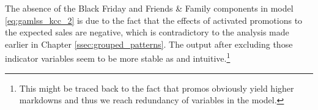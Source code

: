 The absence of the Black Friday and Friends \& Family components in model \ref{eq:gamlss_kcc_2} is due to the fact that the effects of activated promotions to the expected sales are negative, which is contradictory to the analysis made earlier in Chapter \ref{ssec:grouped_patterns}. The output after excluding those indicator variables seem to be more stable as and intuitive.\footnote{This might be traced back to the fact that promos obviously yield higher markdowns and thus we reach redundancy of variables in the model.}















